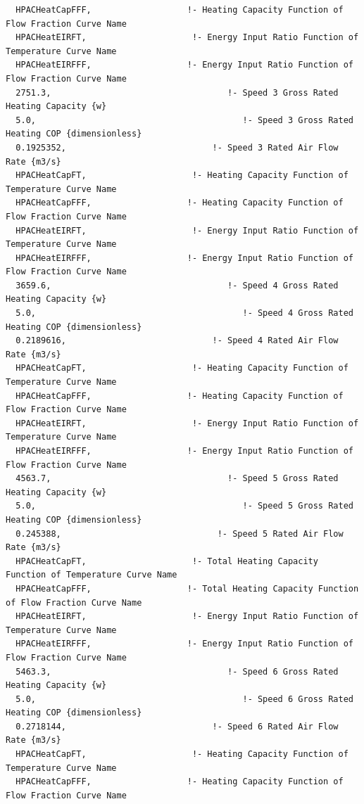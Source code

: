 \begin{lstlisting}
  HPACHeatCapFFF,                   !- Heating Capacity Function of Flow Fraction Curve Name
  HPACHeatEIRFT,                     !- Energy Input Ratio Function of Temperature Curve Name
  HPACHeatEIRFFF,                   !- Energy Input Ratio Function of Flow Fraction Curve Name
  2751.3,                                   !- Speed 3 Gross Rated Heating Capacity {w}
  5.0,                                         !- Speed 3 Gross Rated Heating COP {dimensionless}
  0.1925352,                             !- Speed 3 Rated Air Flow Rate {m3/s}
  HPACHeatCapFT,                     !- Heating Capacity Function of Temperature Curve Name
  HPACHeatCapFFF,                   !- Heating Capacity Function of Flow Fraction Curve Name
  HPACHeatEIRFT,                     !- Energy Input Ratio Function of Temperature Curve Name
  HPACHeatEIRFFF,                   !- Energy Input Ratio Function of Flow Fraction Curve Name
  3659.6,                                   !- Speed 4 Gross Rated Heating Capacity {w}
  5.0,                                         !- Speed 4 Gross Rated Heating COP {dimensionless}
  0.2189616,                             !- Speed 4 Rated Air Flow Rate {m3/s}
  HPACHeatCapFT,                     !- Heating Capacity Function of Temperature Curve Name
  HPACHeatCapFFF,                   !- Heating Capacity Function of Flow Fraction Curve Name
  HPACHeatEIRFT,                     !- Energy Input Ratio Function of Temperature Curve Name
  HPACHeatEIRFFF,                   !- Energy Input Ratio Function of Flow Fraction Curve Name
  4563.7,                                   !- Speed 5 Gross Rated Heating Capacity {w}
  5.0,                                         !- Speed 5 Gross Rated Heating COP {dimensionless}
  0.245388,                               !- Speed 5 Rated Air Flow Rate {m3/s}
  HPACHeatCapFT,                     !- Total Heating Capacity Function of Temperature Curve Name
  HPACHeatCapFFF,                   !- Total Heating Capacity Function of Flow Fraction Curve Name
  HPACHeatEIRFT,                     !- Energy Input Ratio Function of Temperature Curve Name
  HPACHeatEIRFFF,                   !- Energy Input Ratio Function of Flow Fraction Curve Name
  5463.3,                                   !- Speed 6 Gross Rated Heating Capacity {w}
  5.0,                                         !- Speed 6 Gross Rated Heating COP {dimensionless}
  0.2718144,                             !- Speed 6 Rated Air Flow Rate {m3/s}
  HPACHeatCapFT,                     !- Heating Capacity Function of Temperature Curve Name
  HPACHeatCapFFF,                   !- Heating Capacity Function of Flow Fraction Curve Name

\end{lstlisting}
